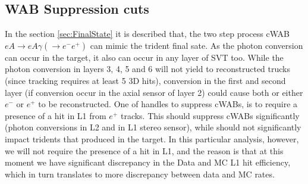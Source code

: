 \documentclass[letterpaper,12pt]{article}
\def \rarr {\rightarrow}
\begin{document}
\subsection{WAB Suppression cuts}
In the section \ref{sec:FinalState} it is described that, the two step process cWAB $eA\rarr eA\gamma(\rarr e^{-}e^{+})$ can mimic the trident final sate. As the photon conversion can occur in the target, it also can occur in any layer of SVT too. While the photon conversion in layers 3, 4, 5 and 6 will not yield to reconstructed trucks (since tracking requires at least 5 3D hits), conversion in the first and second layer (if conversion occur in the axial sensor of layer 2) could cause both or either $e^{-}$ or $e^{+}$ to be reconstructed. One of handles to suppress cWABs, is to require a presence of a hit in L1 from $e^{+}$ tracks. This should suppress cWABs significantly (photon conversions in L2 and in L1 stereo sensor), while should not significantly impact tridents that produced in the target. In this particular analysis, however, we will not require the presence of a hit in L1, and the reason is that at this moment we have significant discrepancy in the Data and MC L1 hit efficiency, which in turn translates to more discrepancy between data and MC rates.
\end{document}
